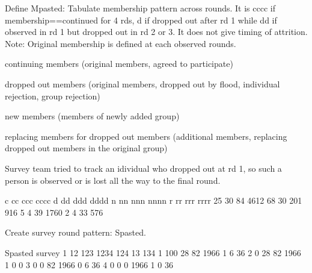 Define \textsf{Mpasted}: Tabulate membership pattern across rounds. It is \textsf{cccc} if \textsf{membership==continued} for 4 rds, \textsf{d} if dropped out after rd 1 while \textsf{dd} if observed in rd 1 but dropped out in rd 2 or 3. It does not give timing of attrition. Note: Original \textsf{membership} is defined at each observed rounds. 
\begin{description}
\vspace{1.0ex}\setlength{\itemsep}{1.0ex}\setlength{\baselineskip}{12pt}
\item[c]	continuing members (original members, agreed to participate)
\item[d]	dropped out members (original members, dropped out by flood, individual rejection, group rejection)
\item[n]	new members (members of newly added group)
\item[r]	replacing members for dropped out members (additional members, replacing dropped out members in the original group)
\end{description}
Survey team tried to track an idividual who dropped out at rd 1, so such a person is observed or is lost all the way to the final round. 
\begin{Schunk}
\begin{Soutput}

   c   cc  ccc cccc    d   dd  ddd dddd    n   nn  nnn nnnn    r   rr  rrr rrrr 
  25   30   84 4612   68   30  201  916    5    4   39 1760    2    4   33  576 
\end{Soutput}
\end{Schunk}
Create survey round pattern: \textsf{Spasted}.
\begin{Schunk}
\begin{Soutput}
      Spasted
survey    1   12  123 1234  124   13  134
     1  100   28   82 1966    1    6   36
     2    0   28   82 1966    1    0    0
     3    0    0   82 1966    0    6   36
     4    0    0    0 1966    1    0   36
\end{Soutput}
\end{Schunk}



